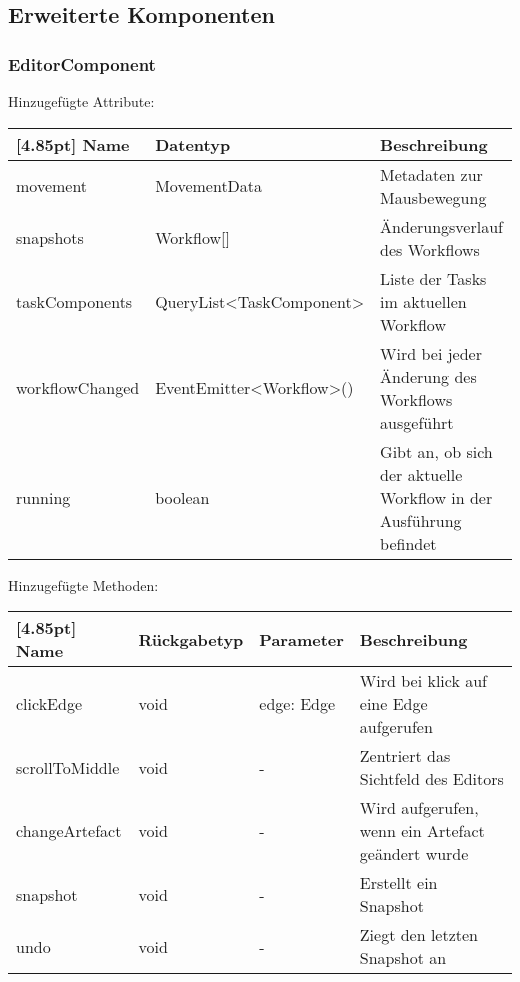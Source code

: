     	 \subsection{Erweiterte Komponenten}
    	 
    	 \subsubsection{EditorComponent}
			Hinzugefügte Attribute:
			\begin{center}
				\setlength\tabcolsep{5pt}
				\renewcommand{\arraystretch}{1.5}
				
				\begin{tabularx}{\textwidth}{|l|l|X|}
					\hline
					\rowcolor[gray]{0.90}[4.85pt]
					Name & Datentyp & Beschreibung \\ \hline 
					movement & MovementData & Metadaten zur Mausbewegung \\ \hline
					snapshots & Workflow[] & Änderungsverlauf des Workflows \\ \hline
                    taskComponents & QueryList<TaskComponent> & Liste der Tasks im aktuellen Workflow \\ \hline
					workflowChanged & EventEmitter<Workflow>() & Wird bei jeder Änderung des Workflows ausgeführt \\ \hline
					running & boolean & Gibt an, ob sich der aktuelle Workflow in der Ausführung befindet \\ \hline
				\end{tabularx}
			\end{center}
			Hinzugefügte Methoden:
			\begin{center}
    			\setlength\tabcolsep{5pt}
    			\renewcommand{\arraystretch}{1.5}
    			
    			\begin{tabularx}{\textwidth}{|l|l|l|X|}
    				\hline
    				\rowcolor[gray]{0.90}[4.85pt]
    				Name & Rückgabetyp & Parameter & Beschreibung \\ \hline

    				clickEdge & void & edge: Edge & Wird bei klick auf eine Edge aufgerufen \\ \hline
    				scrollToMiddle & void & - & Zentriert das Sichtfeld des Editors \\ \hline
    				changeArtefact & void & - & Wird aufgerufen, wenn ein Artefact geändert wurde \\ \hline
    				snapshot & void & - & Erstellt ein Snapshot \\ \hline
    				undo & void & - & Ziegt den letzten Snapshot an \\ \hline
    			 \hline
    			\end{tabularx}
		    \end{center}
		    
